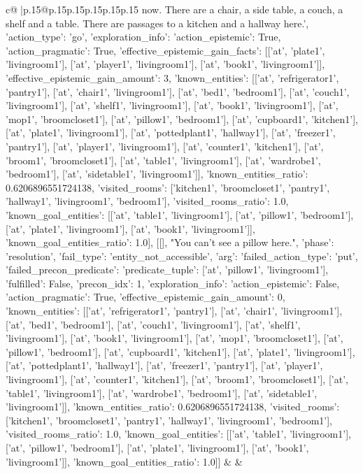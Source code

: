 \documentclass{article}
\begin{document}
{\begin{supertabular}{c@{$\;$}|p{.15\linewidth}@{}p{.15\linewidth}p{.15\linewidth}p{.15\linewidth}p{.15\linewidth}p{.15\linewidth}}
{{{now. There are a chair, a side table, a couch, a shelf and a table. There are passages to a kitchen and a hallway here.', {'action_type': 'go', 'exploration_info': {'action_epistemic': True, 'action_pragmatic': True, 'effective_epistemic_gain_facts': [['at', 'plate1', 'livingroom1'], ['at', 'player1', 'livingroom1'], ['at', 'book1', 'livingroom1']], 'effective_epistemic_gain_amount': 3, 'known_entities': [['at', 'refrigerator1', 'pantry1'], ['at', 'chair1', 'livingroom1'], ['at', 'bed1', 'bedroom1'], ['at', 'couch1', 'livingroom1'], ['at', 'shelf1', 'livingroom1'], ['at', 'book1', 'livingroom1'], ['at', 'mop1', 'broomcloset1'], ['at', 'pillow1', 'bedroom1'], ['at', 'cupboard1', 'kitchen1'], ['at', 'plate1', 'livingroom1'], ['at', 'pottedplant1', 'hallway1'], ['at', 'freezer1', 'pantry1'], ['at', 'player1', 'livingroom1'], ['at', 'counter1', 'kitchen1'], ['at', 'broom1', 'broomcloset1'], ['at', 'table1', 'livingroom1'], ['at', 'wardrobe1', 'bedroom1'], ['at', 'sidetable1', 'livingroom1']], 'known_entities_ratio': 0.6206896551724138, 'visited_rooms': ['kitchen1', 'broomcloset1', 'pantry1', 'hallway1', 'livingroom1', 'bedroom1'], 'visited_rooms_ratio': 1.0, 'known_goal_entities': [['at', 'table1', 'livingroom1'], ['at', 'pillow1', 'bedroom1'], ['at', 'plate1', 'livingroom1'], ['at', 'book1', 'livingroom1']], 'known_goal_entities_ratio': 1.0}}], [[], "You can't see a pillow here.", {'phase': 'resolution', 'fail_type': 'entity_not_accessible', 'arg': {'failed_action_type': 'put', 'failed_precon_predicate': {'predicate_tuple': ['at', 'pillow1', 'livingroom1'], 'fulfilled': False, 'precon_idx': 1}}, 'exploration_info': {'action_epistemic': False, 'action_pragmatic': True, 'effective_epistemic_gain_amount': 0, 'known_entities': [['at', 'refrigerator1', 'pantry1'], ['at', 'chair1', 'livingroom1'], ['at', 'bed1', 'bedroom1'], ['at', 'couch1', 'livingroom1'], ['at', 'shelf1', 'livingroom1'], ['at', 'book1', 'livingroom1'], ['at', 'mop1', 'broomcloset1'], ['at', 'pillow1', 'bedroom1'], ['at', 'cupboard1', 'kitchen1'], ['at', 'plate1', 'livingroom1'], ['at', 'pottedplant1', 'hallway1'], ['at', 'freezer1', 'pantry1'], ['at', 'player1', 'livingroom1'], ['at', 'counter1', 'kitchen1'], ['at', 'broom1', 'broomcloset1'], ['at', 'table1', 'livingroom1'], ['at', 'wardrobe1', 'bedroom1'], ['at', 'sidetable1', 'livingroom1']], 'known_entities_ratio': 0.6206896551724138, 'visited_rooms': ['kitchen1', 'broomcloset1', 'pantry1', 'hallway1', 'livingroom1', 'bedroom1'], 'visited_rooms_ratio': 1.0, 'known_goal_entities': [['at', 'table1', 'livingroom1'], ['at', 'pillow1', 'bedroom1'], ['at', 'plate1', 'livingroom1'], ['at', 'book1', 'livingroom1']], 'known_goal_entities_ratio': 1.0}}]] 
	  } 
	   } 
	   } 
	 & & \\ 
 


\end{supertabular}}
\end{document}

